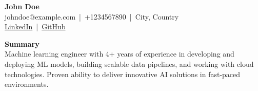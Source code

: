 \documentclass[10pt]{article}
\begin{document}
    \begin{center}
        {\Huge \textbf{John Doe}} \\
        \vspace{5pt}
        johndoe@example.com \,|\, +1234567890 \,|\, City, Country \\
        \href{https://www.linkedin.com/in/johndoe}{LinkedIn} \,|\, \href{https://github.com/johndoe}{GitHub}
    \end{center}

    \vspace{10pt}
    \noindent \textbf{Summary} \\
    Machine learning engineer with 4+ years of experience in developing and deploying ML models, building scalable data pipelines, and working with cloud technologies. Proven ability to deliver innovative AI solutions in fast-paced environments.
\end{document}
